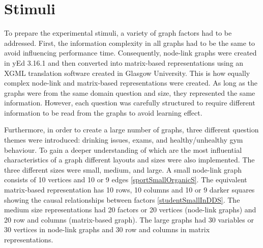 \documentclass{l4proj}
\begin{document}
\section{Stimuli}

To prepare the experimental stimuli, a variety of graph factors had to be addressed. First, the information complexity in all graphs had to be the same to avoid influencing performance time. Consequently, node-link graphs were created in yEd 3.16.1 and then converted into matrix-based representations using an XGML translation software created in Glasgow University. This is how equally complex node-link and matrix-based representations were created. As long as the graphs were from the same domain question and size, they represented the same information. However, each question was carefully structured to require different information to be read from the graphs to avoid learning effect. 

Furthermore, in order to create a large number of graphs, three different question themes were introduced: drinking issues, exams, and healthy/unhealthy gym behaviour. To gain a deeper understanding of which are the most influential characteristics of a graph different layouts and sizes were also implemented. The three different sizes were small, medium, and large. A small node-link graph consists of 10 vertices and 10 or 9 edges \ref{sportSmallOrganicS}. The equivalent matrix-based representation has 10 rows, 10 columns and 10 or 9 darker squares showing the causal relationships between factors \ref{studentSmallInDDS}. The medium size representations had 20 factors or 20 vertices (node-link graphs) and 20 row and columns (matrix-based graph). The large graphs had 30 variables or 30 vertices in node-link graphs and 30 row and columns in matrix representations. 
\end{document}
